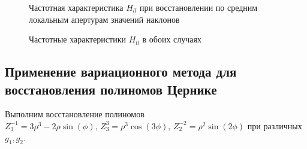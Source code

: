 \documentclass{article}
\begin{document}
\begin{figure}[H]
\caption{Частотная характеристика $H_{ll}$ при восстановлении по средним локальным апертурам значений наклонов}
\end{figure}
\begin{figure}[H]
\caption{Частотные характеристики $H_{ll}$ в обоих случаях}
\end{figure}


\subsection{Применение вариационного метода для восстановления полиномов Цернике}
Выполним восстановление полиномов $Z_3^{-1} = 3\rho^3 - 2\rho  \sin(\phi),\,Z_3^{3} = \rho^3  \cos(3\phi),\,Z_2^{-2} = \rho^2 \sin(2\phi)$ при различных $g_1, g_2$.
\end{document}
